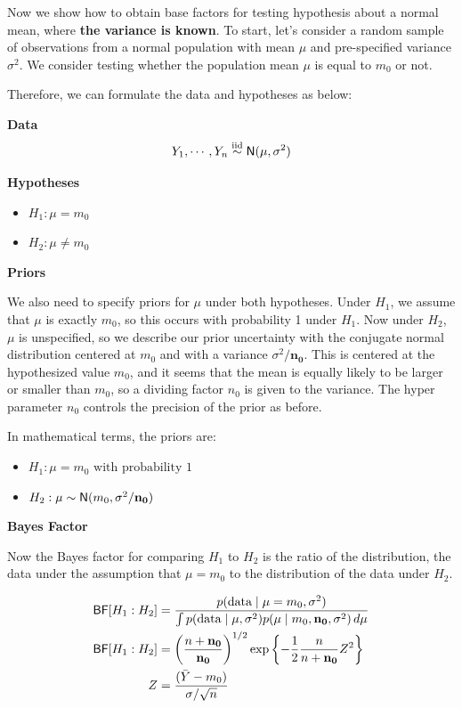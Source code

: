 \documentclass[]{book}
\providecommand{\tightlist}{%
  \setlength{\itemsep}{0pt}\setlength{\parskip}{0pt}}
\theoremstyle{definition}
\theoremstyle{definition}
\theoremstyle{definition}
\theoremstyle{remark}
\begin{document}
Now we show how to obtain base factors for testing hypothesis about a
normal mean, where \textbf{the variance is known}. To start, let's
consider a random sample of observations from a normal population with
mean \(\mu\) and pre-specified variance \(\sigma^2\). We consider
testing whether the population mean \(\mu\) is equal to \(m_0\) or not.

Therefore, we can formulate the data and hypotheses as below:

\textbf{Data} \[Y_1, \cdots, Y_n \mathrel{\mathop{\sim}\limits^{\rm iid}} \textsf{N}(\mu, \sigma^2)\]

\textbf{Hypotheses}

\begin{itemize}
\tightlist
\item
  \(H_1: \mu = m_0\)
\item
  \(H_2: \mu \neq m_0\)
\end{itemize}

\textbf{Priors}

We also need to specify priors for \(\mu\) under both hypotheses. Under
\(H_1\), we assume that \(\mu\) is exactly \(m_0\), so this occurs with
probability 1 under \(H_1\). Now under \(H_2\), \(\mu\) is unspecified,
so we describe our prior uncertainty with the conjugate normal
distribution centered at \(m_0\) and with a variance
\(\sigma^2/\mathbf{n_0}\). This is centered at the hypothesized value
\(m_0\), and it seems that the mean is equally likely to be larger or
smaller than \(m_0\), so a dividing factor \(n_0\) is given to the
variance. The hyper parameter \(n_0\) controls the precision of the
prior as before.

In mathematical terms, the priors are:

\begin{itemize}
\tightlist
\item
  \(H_1: \mu = m_0 \text{  with probability 1}\)
\item
  \(H_2: \mu \sim \textsf{N}(m_0, \sigma^2/\mathbf{n_0})\)
\end{itemize}

\textbf{Bayes Factor}

Now the Bayes factor for comparing \(H_1\) to \(H_2\) is the ratio of
the distribution, the data under the assumption that \(\mu = m_0\) to
the distribution of the data under \(H_2\).

\[\begin{aligned}
\textsf{BF}[H_1 : H_2] &= \frac{p(\text{data} \mid \mu = m_0, \sigma^2 )}
 {\int p(\text{data} \mid \mu, \sigma^2) p(\mu \mid m_0, \mathbf{n_0}, \sigma^2)\, d \mu} \\ 
\textsf{BF}[H_1 : H_2] &=\left(\frac{n + \mathbf{n_0}}{\mathbf{n_0}} \right)^{1/2} \exp\left\{-\frac 1 2 \frac{n }{n + \mathbf{n_0}} Z^2 \right\} \\
 Z   &=  \frac{(\bar{Y} - m_0)}{\sigma/\sqrt{n}}
\end{aligned}\]
\end{document}
